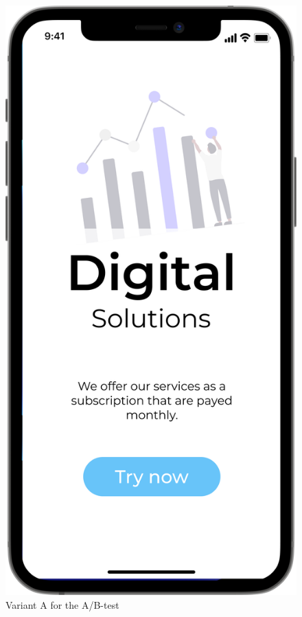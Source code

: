 \begin{figure}[H]
  \centering
  \begin{minipage}[b]{0.45\textwidth}
    \includegraphics[width=\linewidth]{images/A.png}
    \caption{Variant A for the A/B-test}

\end{minipage}
\end{figure}
